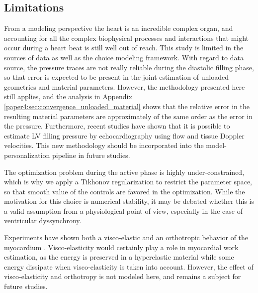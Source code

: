 


\subsection{Limitations}

From a modeling perspective the heart is an incredible complex organ,
and accounting for all the complex biophysical processes and
interactions that might occur during a heart beat is still well out of
reach. This study is limited in the sources of data as well as the
choice modeling framework. With regard to data source, the
pressure traces are not really reliable during the diastolic filling
phase, so that error is expected to be present in the joint estimation
of unloaded geometries and material parameters. However, the
methodology presented here still applies, and the analysis in Appendix
\ref{paper4:sec:convergence_unloaded_material} shows that the relative error
in the  resulting material parameters are approximately of the same
order as the error in the pressure. Furthermore, recent studies have
shown that it is
possible to estimate LV filling pressure by echocardiography
\cite{andersen2017estimating} using flow and tissue Doppler
velocities. This new methodology should be incorporated into the
model-personalization pipeline in future studies.

The optimization problem during the active phase is highly
under-constrained, which is why we apply a Tikhonov regularization to
restrict the parameter space, so that smooth value of the controls are
favored in the optimization. While the motivation for this choice is
numerical stability, it may be debated whether this is a valid
assumption from a physiological point of view, especially in the case
of ventricular dyssynchrony.  

Experiments have shown both a visco-elastic and an orthotropic
behavior of the myocardium
\cite{dokos2002shear,sommer2015biomechanical}.
Visco-elasticity would certainly play a role in myocardial work estimation,
as the energy is preserved in a hyperelastic material while some energy dissipate when
visco-elasticity is taken into account. However, the effect of
visco-elasticity and orthotropy is not modeled here, and remains a
subject for future studies. 


